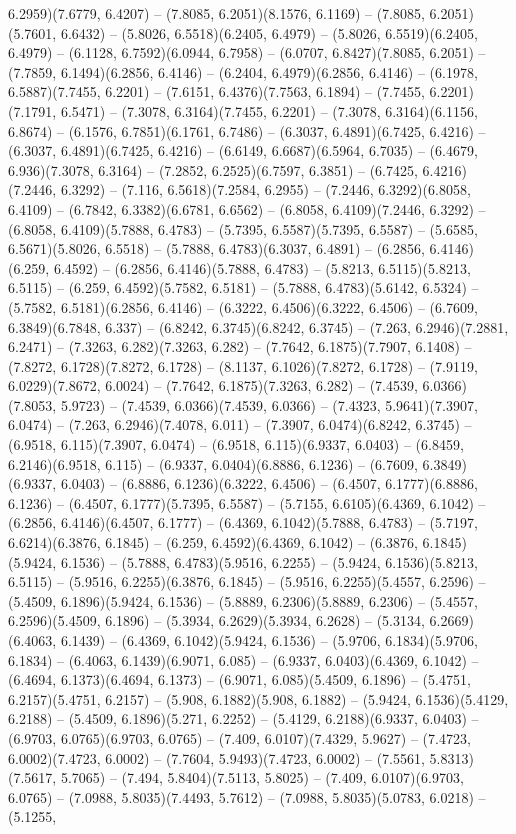6.2959)(7.6779, 6.4207) -- (7.8085, 6.2051)(8.1576, 6.1169) -- (7.8085, 6.2051)(5.7601, 6.6432) -- (5.8026, 6.5518)(6.2405, 6.4979) -- (5.8026, 6.5519)(6.2405, 6.4979) -- (6.1128, 6.7592)(6.0944, 6.7958) -- (6.0707, 6.8427)(7.8085, 6.2051) -- (7.7859, 6.1494)(6.2856, 6.4146) -- (6.2404, 6.4979)(6.2856, 6.4146) -- (6.1978, 6.5887)(7.7455, 6.2201) -- (7.6151, 6.4376)(7.7563, 6.1894) -- (7.7455, 6.2201)(7.1791, 6.5471) -- (7.3078, 6.3164)(7.7455, 6.2201) -- (7.3078, 6.3164)(6.1156, 6.8674) -- (6.1576, 6.7851)(6.1761, 6.7486) -- (6.3037, 6.4891)(6.7425, 6.4216) -- (6.3037, 6.4891)(6.7425, 6.4216) -- (6.6149, 6.6687)(6.5964, 6.7035) -- (6.4679, 6.936)(7.3078, 6.3164) -- (7.2852, 6.2525)(6.7597, 6.3851) -- (6.7425, 6.4216)(7.2446, 6.3292) -- (7.116, 6.5618)(7.2584, 6.2955) -- (7.2446, 6.3292)(6.8058, 6.4109) -- (6.7842, 6.3382)(6.6781, 6.6562) -- (6.8058, 6.4109)(7.2446, 6.3292) -- (6.8058, 6.4109)(5.7888, 6.4783) -- (5.7395, 6.5587)(5.7395, 6.5587) -- (5.6585, 6.5671)(5.8026, 6.5518) -- (5.7888, 6.4783)(6.3037, 6.4891) -- (6.2856, 6.4146)(6.259, 6.4592) -- (6.2856, 6.4146)(5.7888, 6.4783) -- (5.8213, 6.5115)(5.8213, 6.5115) -- (6.259, 6.4592)(5.7582, 6.5181) -- (5.7888, 6.4783)(5.6142, 6.5324) -- (5.7582, 6.5181)(6.2856, 6.4146) -- (6.3222, 6.4506)(6.3222, 6.4506) -- (6.7609, 6.3849)(6.7848, 6.337) -- (6.8242, 6.3745)(6.8242, 6.3745) -- (7.263, 6.2946)(7.2881, 6.2471) -- (7.3263, 6.282)(7.3263, 6.282) -- (7.7642, 6.1875)(7.7907, 6.1408) -- (7.8272, 6.1728)(7.8272, 6.1728) -- (8.1137, 6.1026)(7.8272, 6.1728) -- (7.9119, 6.0229)(7.8672, 6.0024) -- (7.7642, 6.1875)(7.3263, 6.282) -- (7.4539, 6.0366)(7.8053, 5.9723) -- (7.4539, 6.0366)(7.4539, 6.0366) -- (7.4323, 5.9641)(7.3907, 6.0474) -- (7.263, 6.2946)(7.4078, 6.011) -- (7.3907, 6.0474)(6.8242, 6.3745) -- (6.9518, 6.115)(7.3907, 6.0474) -- (6.9518, 6.115)(6.9337, 6.0403) -- (6.8459, 6.2146)(6.9518, 6.115) -- (6.9337, 6.0404)(6.8886, 6.1236) -- (6.7609, 6.3849)(6.9337, 6.0403) -- (6.8886, 6.1236)(6.3222, 6.4506) -- (6.4507, 6.1777)(6.8886, 6.1236) -- (6.4507, 6.1777)(5.7395, 6.5587) -- (5.7155, 6.6105)(6.4369, 6.1042) -- (6.2856, 6.4146)(6.4507, 6.1777) -- (6.4369, 6.1042)(5.7888, 6.4783) -- (5.7197, 6.6214)(6.3876, 6.1845) -- (6.259, 6.4592)(6.4369, 6.1042) -- (6.3876, 6.1845)(5.9424, 6.1536) -- (5.7888, 6.4783)(5.9516, 6.2255) -- (5.9424, 6.1536)(5.8213, 6.5115) -- (5.9516, 6.2255)(6.3876, 6.1845) -- (5.9516, 6.2255)(5.4557, 6.2596) -- (5.4509, 6.1896)(5.9424, 6.1536) -- (5.8889, 6.2306)(5.8889, 6.2306) -- (5.4557, 6.2596)(5.4509, 6.1896) -- (5.3934, 6.2629)(5.3934, 6.2628) -- (5.3134, 6.2669)(6.4063, 6.1439) -- (6.4369, 6.1042)(5.9424, 6.1536) -- (5.9706, 6.1834)(5.9706, 6.1834) -- (6.4063, 6.1439)(6.9071, 6.085) -- (6.9337, 6.0403)(6.4369, 6.1042) -- (6.4694, 6.1373)(6.4694, 6.1373) -- (6.9071, 6.085)(5.4509, 6.1896) -- (5.4751, 6.2157)(5.4751, 6.2157) -- (5.908, 6.1882)(5.908, 6.1882) -- (5.9424, 6.1536)(5.4129, 6.2188) -- (5.4509, 6.1896)(5.271, 6.2252) -- (5.4129, 6.2188)(6.9337, 6.0403) -- (6.9703, 6.0765)(6.9703, 6.0765) -- (7.409, 6.0107)(7.4329, 5.9627) -- (7.4723, 6.0002)(7.4723, 6.0002) -- (7.7604, 5.9493)(7.4723, 6.0002) -- (7.5561, 5.8313)(7.5617, 5.7065) -- (7.494, 5.8404)(7.5113, 5.8025) -- (7.409, 6.0107)(6.9703, 6.0765) -- (7.0988, 5.8035)(7.4493, 5.7612) -- (7.0988, 5.8035)(5.0783, 6.0218) -- (5.1255, 